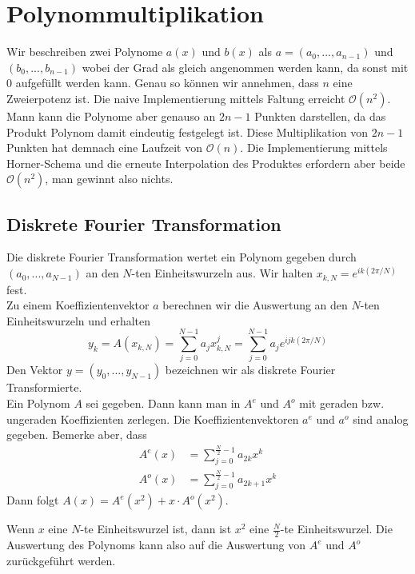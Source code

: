 \documentclass[a4paper, 12pt]{article}
\begin{document}
	\section{Polynommultiplikation}
	Wir beschreiben zwei Polynome $a(x)$ und $b(x)$ als $a = (a_0,...,a_{n-1})$ und $(b_0,...,b_{n-1})$ wobei der Grad als gleich angenommen werden kann, da sonst mit $0$ aufgefüllt werden kann. Genau so können wir annehmen, dass $n$ eine Zweierpotenz ist. Die naive Implementierung mittels Faltung erreicht $\mathcal{O}(n^2)$. Mann kann die Polynome aber genauso an $2n-1$ Punkten darstellen, da das Produkt Polynom damit eindeutig festgelegt ist. Diese Multiplikation von $2n-1$ Punkten hat demnach eine Laufzeit von $\mathcal{O}(n)$. Die Implementierung mittels Horner-Schema und die erneute Interpolation des Produktes erfordern aber beide $\mathcal{O}(n^2)$, man gewinnt also nichts.
	\subsection{Diskrete Fourier Transformation}
	Die diskrete Fourier Transformation wertet ein Polynom gegeben durch $(a_0,...,a_{N-1})$ an den $N$-ten Einheitswurzeln aus. Wir halten $x_{k,N} = e^{i k(2\pi/N)}$ fest.\\
	Zu einem Koeffizientenvektor $a$ berechnen wir die Auswertung an den $N$-ten Einheitswurzeln und erhalten \[y_k = A(x_{k,N}) = \sum_{j=0}^{N-1} a_j x_{k,N}^j = \sum_{j=0}^{N-1}a_j e^{ijk(2\pi/N)}\]
	Den Vektor $y = (y_0,...,y_{N-1})$ bezeichnen wir als diskrete Fourier Transformierte.\\
	Ein Polynom $A$ sei gegeben. Dann kann man in $A^e$ und $A^o$ mit geraden bzw. ungeraden Koeffizienten zerlegen. Die Koeffizientenvektoren $a^e$ und $a^o$ sind analog gegeben. Bemerke aber, dass \begin{align*}
		A^e(x) &= \sum_{j=0}^{\frac{N}{2}-1} a_{2k}x^k\\
		A^o(x) &= \sum_{j=0}^{\frac{N}{2}-1} a_{2k+1}x^k
	\end{align*}
	Dann folgt $A(x) = A^e(x^2) + x\cdot A^o(x^2)$.

	Wenn $x$ eine $N$-te Einheitswurzel ist, dann ist $x^2$ eine $\frac{N}{2}$-te Einheitswurzel. Die Auswertung des Polynoms kann also auf die Auswertung von $A^e$ und $A^o$ zurückgeführt werden.
\end{document}
